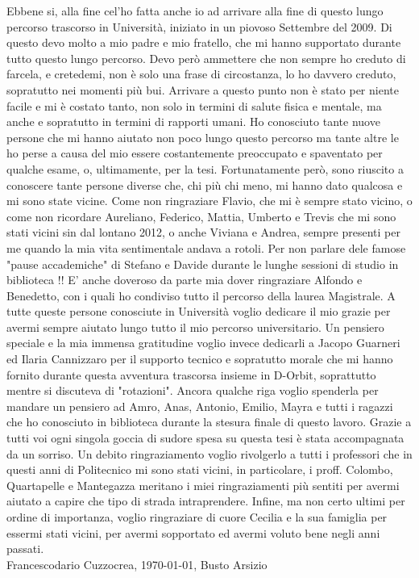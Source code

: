 Ebbene si, alla fine cel'ho fatta anche io ad arrivare alla fine di questo lungo percorso trascorso in Università, iniziato in un piovoso Settembre del 2009. Di questo devo molto a mio padre e mio fratello, che mi hanno supportato durante tutto questo lungo percorso. Devo però ammettere che non sempre ho creduto di farcela, e cretedemi, non è solo una frase di circostanza, lo ho davvero creduto, sopratutto nei momenti più bui. Arrivare a questo punto non è stato per niente facile e mi è costato tanto, non solo in termini di salute fisica e mentale, ma anche e sopratutto in termini di rapporti umani. Ho conosciuto tante nuove persone che mi hanno aiutato non poco lungo questo percorso ma tante altre le ho perse a causa del mio essere costantemente preoccupato e spaventato per qualche esame, o, ultimamente, per la tesi. Fortunatamente però, sono riuscito a conoscere tante persone diverse che, chi più chi meno, mi hanno dato qualcosa e mi sono state vicine. Come non ringraziare Flavio, che mi è sempre stato vicino, o come non ricordare Aureliano, Federico, Mattia, Umberto e Trevis che mi sono stati vicini sin dal lontano 2012, o anche Viviana e Andrea, sempre presenti per me quando la mia vita sentimentale andava a rotoli. Per non parlare dele famose "pause accademiche" di Stefano e Davide durante le lunghe sessioni di studio in biblioteca !! E' anche doveroso da parte mia dover ringraziare Alfondo e Benedetto, con i quali ho condiviso tutto il percorso della laurea Magistrale. A tutte queste persone conosciute in Università voglio dedicare il mio grazie per avermi sempre aiutato lungo tutto il mio percorso universitario. Un pensiero speciale e la mia immensa gratitudine voglio invece dedicarli a Jacopo Guarneri ed Ilaria Cannizzaro per il supporto tecnico e sopratutto morale che mi hanno fornito durante questa avventura trascorsa insieme in D-Orbit, soprattutto mentre si discuteva di "rotazioni". Ancora qualche riga voglio spenderla per mandare un pensiero ad Amro, Anas, Antonio, Emilio, Mayra e tutti i ragazzi che ho conosciuto in biblioteca durante la stesura finale di questo lavoro. Grazie a tutti voi ogni singola goccia di sudore spesa su questa tesi è stata accompagnata da un sorriso. Un debito ringraziamento voglio rivolgerlo a tutti i professori che in questi anni di Politecnico mi sono stati vicini, in particolare, i proff. Colombo, Quartapelle e Mantegazza meritano i miei ringraziamenti più sentiti per avermi aiutato a capire che tipo di strada intraprendere.
Infine, ma non certo ultimi per ordine di importanza, voglio ringraziare di cuore Cecilia e la sua famiglia per essermi stati vicini, per avermi sopportato ed avermi voluto bene negli anni passati.\\


Francescodario Cuzzocrea, \today, Busto Arsizio